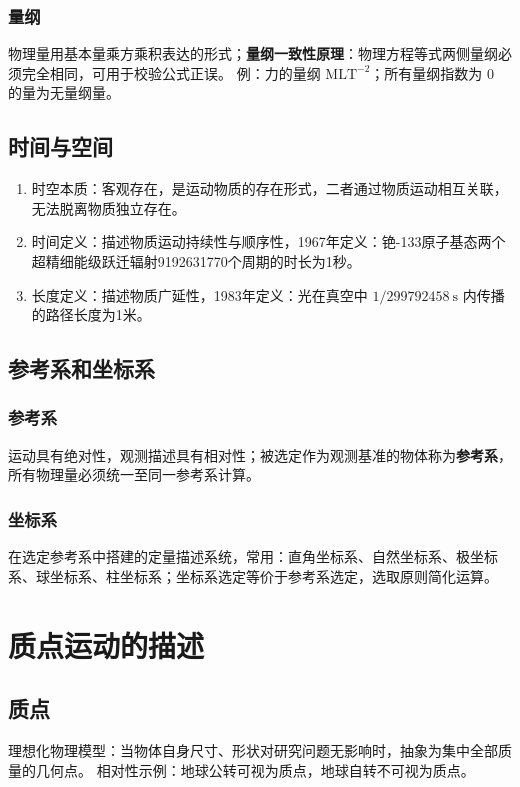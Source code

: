     \subsubsection{量纲}
    物理量用基本量乘方乘积表达的形式；\textbf{量纲一致性原理}：物理方程等式两侧量纲必须完全相同，可用于校验公式正误。
    例：力的量纲 $\mathrm{MLT^{-2}}$；所有量纲指数为 $0$ 的量为无量纲量。

    \subsection{时间与空间}
    \begin{enumerate}
        \item 时空本质：客观存在，是运动物质的存在形式，二者通过物质运动相互关联，无法脱离物质独立存在。
        \item 时间定义：描述物质运动持续性与顺序性，1967年定义：铯-133原子基态两个超精细能级跃迁辐射9192631770个周期的时长为1秒。
        \item 长度定义：描述物质广延性，1983年定义：光在真空中 $1/299792458\ \mathrm{s}$ 内传播的路径长度为1米。
    \end{enumerate}

    \subsection{参考系和坐标系}
        \subsubsection{参考系}
        运动具有绝对性，观测描述具有相对性；被选定作为观测基准的物体称为\textbf{参考系}，所有物理量必须统一至同一参考系计算。

        \subsubsection{坐标系}
        在选定参考系中搭建的定量描述系统，常用：直角坐标系、自然坐标系、极坐标系、球坐标系、柱坐标系；坐标系选定等价于参考系选定，选取原则简化运算。

\section{质点运动的描述}
    \subsection{质点}
    理想化物理模型：当物体自身尺寸、形状对研究问题无影响时，抽象为集中全部质量的几何点。
    相对性示例：地球公转可视为质点，地球自转不可视为质点。

